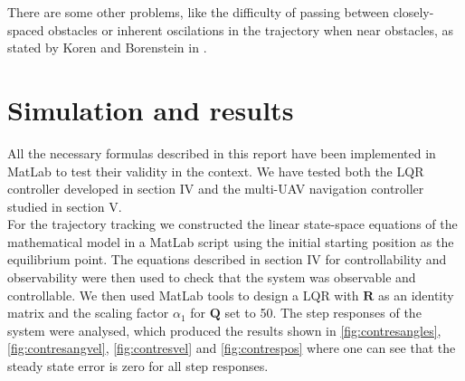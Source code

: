 \documentclass[journal, twoside]{IEEEtran}
\newcommand*{\subb}[1]{_{\mathrm{#1}}}
\begin{document}
%	
		
		There are some other problems, like the difficulty of passing between closely-spaced obstacles or inherent oscilations in the trajectory when near obstacles, as stated by Koren and Borenstein in \cite{koren_pot_fields_limitations}. 
	
	\section{Simulation and results}
	All the necessary formulas described in this report have been implemented in MatLab to test their validity in the context. We have tested both the LQR controller developed in section IV and the multi-UAV navigation controller studied in section V. \\
	
	For the trajectory tracking we constructed the linear state-space equations of the mathematical model in a MatLab script using the initial starting position as the equilibrium point. The equations described in section IV for controllability and observability were then used to check that the system was observable and controllable.  We then used MatLab tools to design a LQR with $\bm{R}$ as an identity matrix and the scaling factor $\alpha\subb{1}$ for $\bm{Q}$ set to 50. The step responses of the system were analysed, which produced the results shown in \figurename{ \ref{fig:contresangles}}, \figurename{ \ref{fig:contresangvel}}, \figurename{ \ref{fig:contresvel}} and \figurename{ \ref{fig:contrespos}} where one can see that the steady state error is zero for all step responses.\\
\end{document}

